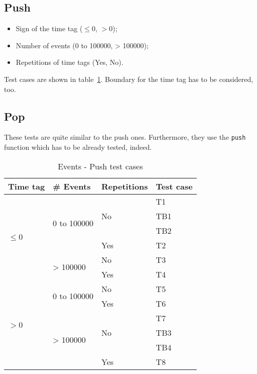 \subsection{Push}
\begin{itemize}
\item Sign of the time tag ($\le 0$, $> 0$);
\item Number of events (0 to 100000, > 100000);
\item Repetitions of time tags (Yes, No).
\end{itemize}
Test cases are shown in table~\ref{tab:events_push}. Boundary for the time tag has to be considered, too.

\subsection{Pop}
These tests are quite similar to the push ones. Furthermore, they use the \texttt{push} function which has to be already tested, indeed. 

\begin{table}
\centering
\begin{tabular}{|l|l|l|l|}
\hline
\textbf{Time tag} & \textbf{\# Events} & Repetitions & \textbf{Test case} \\
\hline
\multirow{6}{*}{$\le 0$} & \multirow{4}{*}{0 to 100000} & \multirow{3}{*}{No} & T1 \\
\cline{4-4}
& & & TB1 \\
\cline{4-4}
& & & TB2 \\
\cline{3-4}
& & Yes & T2 \\
\cline{2-4}
& \multirow{2}{*}{> 100000} & No & T3 \\
\cline{3-4}
& & Yes & T4 \\
\hline
\multirow{6}{*}{$> 0$} & \multirow{2}{*}{0 to 100000} & No & T5 \\
\cline{3-4}
& & Yes & T6 \\
\cline{2-4}
& \multirow{4}{*}{> 100000} & \multirow{3}{*}{No} & T7 \\
& & & TB3 \\
& & & TB4 \\
\cline{3-4}
& & Yes & T8 \\
\hline
\end{tabular}
\caption{Events - Push test cases}
\label{tab:events_push}
\end{table}

